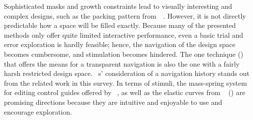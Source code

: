 Sophisticated masks and growth constraints lead to visually interesting and complex designs, such as the packing pattern from~\citeauthor*{saputra_2018_rde}~\cite{saputra_2018_rde}. However, it is not directly predictable how a space will be filled exactly. Because many of the presented methods only offer quite limited interactive performance, even a basic trial and error exploration is hardly feasible; hence, the navigation of the design space becomes cumbersome, and stimulation becomes hindered. The one technique (\cite{santoni_2016_ggp}) that offers the means for a transparent navigation is also the one with a fairly harsh restricted design space. \citeauthor*{santoni_2016_ggp}~\cite{santoni_2016_ggp}s' consideration of a navigation history stands out from the related work in this survey. In terms of stimuli, the mass-spring system for editing control guides offered by \citeauthor*{benes_2011_gpm}~\cite{benes_2011_gpm}, as well as the elastic curves from \citeauthor*{zehnder_2016_dso}~\cite{zehnder_2016_dso} () are promising directions because they are intuitive and enjoyable to use and encourage exploration. 

